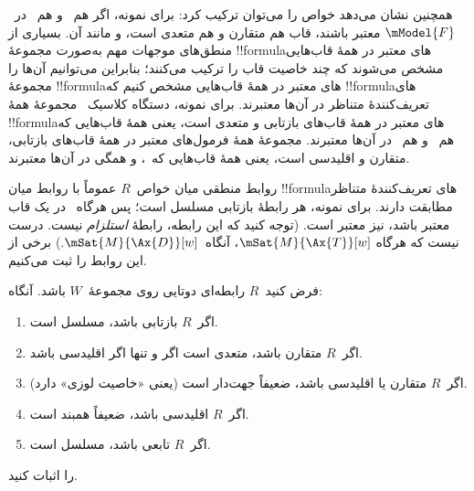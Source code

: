 \documentclass[../../../include/open-logic-section]{subfiles}
\begin{document}
 همچنین نشان می‌دهد خواص را می‌توان
ترکیب کرد: برای نمونه، اگر هم~ و هم~ در~$\mModel{F}$ معتبر
باشند، قاب هم متقارن و هم متعدی است، و مانند آن. بسیاری از منطق‌های
موجهات مهم به‌صورت مجموعهٔ !!{formula}های معتبر در همهٔ قاب‌هایی مشخص
می‌شوند که چند خاصیت قاب را ترکیب می‌کنند؛ بنابراین می‌توانیم آن‌ها را
مجموعهٔ !!{formula}های معتبر در همهٔ قاب‌هایی مشخص کنیم که
!!{formula}های تعریف‌کنندهٔ متناظر در آن‌ها معتبرند. برای نمونه، دستگاه
کلاسیک~ مجموعهٔ همهٔ !!{formula}های معتبر در همهٔ قاب‌های
بازتابی و متعدی است، یعنی همهٔ قاب‌هایی که هم~ و هم~ در
آن‌ها معتبرند.  مجموعهٔ همهٔ فرمول‌های معتبر در همهٔ قاب‌های
بازتابی، متقارن و اقلیدسی است، یعنی همهٔ قاب‌هایی که~،  و
 همگی در آن‌ها معتبرند.

روابط منطقی میان خواص~$R$ عموماً با روابط میان !!{formula}های
تعریف‌کنندهٔ متناظر مطابقت دارند. برای نمونه، هر رابطهٔ بازتابی مسلسل
است؛ پس هرگاه~ در یک قاب معتبر باشد،  نیز معتبر است. (توجه
کنید که این رابطه، رابطهٔ \emph{استلزام} نیست. درست نیست که هرگاه
$\mSat{M}{\Ax{T}}[w]$، آنگاه~$\mSat{M}{\Ax{D}}[w]$.) برخی از این روابط
را ثبت می‌کنیم.

\begin{prop}
  فرض کنید~$R$ رابطه‌ای دوتایی روی مجموعهٔ~$W$ باشد. آنگاه:
  \begin{enumerate}
  \item اگر~$R$ بازتابی باشد، مسلسل است.
  \item اگر~$R$ متقارن باشد، متعدی است اگر و تنها اگر اقلیدسی باشد.
  \item اگر~$R$ متقارن یا اقلیدسی باشد، ضعیفاً جهت‌دار است (یعنی
    «خاصیت لوزی» دارد).
  \item اگر~$R$ اقلیدسی باشد، ضعیفاً همبند است.
  \item اگر~$R$ تابعی باشد، مسلسل است.
  \end{enumerate}
\end{prop}

\begin{prob}
   را اثبات کنید.
\end{prob}
\end{document}
